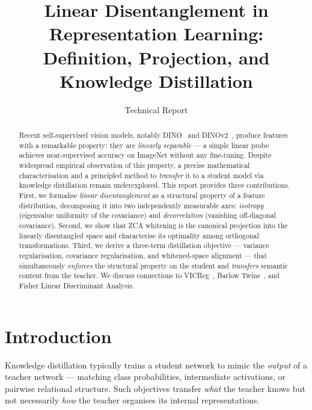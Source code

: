 \documentclass[11pt,a4paper]{article}
\title{\textbf{Linear Disentanglement in Representation Learning:\\
Definition, Projection, and Knowledge Distillation}}
\author{Technical Report}
\date{}
\begin{document}
\maketitle

\begin{abstract}
Recent self-supervised vision models, notably DINO~\citep{caron2021emerging} and
DINOv2~\citep{oquab2023dinov2}, produce features with a remarkable property:
they are \emph{linearly separable} — a simple linear probe achieves near-supervised
accuracy on ImageNet without any fine-tuning.  Despite widespread empirical
observation of this property, a precise mathematical characterisation and a
principled method to \emph{transfer} it to a student model via knowledge
distillation remain underexplored.
This report provides three contributions.
First, we formalise \emph{linear disentanglement} as a structural property of a
feature distribution, decomposing it into two independently measurable axes:
\emph{isotropy} (eigenvalue uniformity of the covariance) and
\emph{decorrelation} (vanishing off-diagonal covariance).
Second, we show that ZCA whitening is the canonical projection into the linearly
disentangled space and characterise its optimality among orthogonal
transformations.
Third, we derive a three-term distillation objective — variance regularisation,
covariance regularisation, and whitened-space alignment — that simultaneously
\emph{enforces} the structural property on the student and \emph{transfers}
semantic content from the teacher.
We discuss connections to VICReg~\citep{bardes2022vicreg}, Barlow
Twins~\citep{zbontar2021barlow}, and Fisher Linear Discriminant Analysis.
\end{abstract}

\tableofcontents
\newpage

\section{Introduction}
\label{sec:intro}

Knowledge distillation typically trains a student network to mimic the
\emph{output} of a teacher network — matching class probabilities, intermediate
activations, or pairwise relational structure.
Such objectives transfer \emph{what} the teacher knows but not necessarily
\emph{how} the teacher organises its internal representations.
\end{document}
